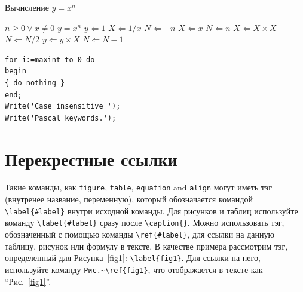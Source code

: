 \documentclass[pdflatex,sn-mathphys-gost]{pmi-jnl}
\begin{document}
\begin{algorithm}
\caption{Вычисление $y = x^n$}\label{algo1}
\begin{algorithmic}[1]
\Require $n \geq 0 \vee x \neq 0$
\Ensure $y = x^n$ 
\State $y \Leftarrow 1$
\label{algln2}
        \State $X \Leftarrow 1 / x$
        \State $N \Leftarrow -n$
\Else
        \State $X \Leftarrow x$
        \State $N \Leftarrow n$
\EndIf
{}
            \State $X \Leftarrow X \times X$
            \State $N \Leftarrow N / 2$
        \Else[$N$ is odd]
            \State $y \Leftarrow y \times X$
            \State $N \Leftarrow N - 1$
        \EndIf
\EndWhile
\end{algorithmic}
\end{algorithm}

\bigskip
\begin{minipage}{\hsize}%
\lstset{frame=single,framexleftmargin=-1pt,framexrightmargin=-17pt,framesep=12pt,linewidth=0.98\textwidth,language=pascal}%
\begin{lstlisting}
for i:=maxint to 0 do
begin
{ do nothing }
end;
Write('Case insensitive ');
Write('Pascal keywords.');
\end{lstlisting}
\end{minipage}

\section{Перекрестные ссылки}\label{sec8}

Такие команды, как \verb+figure+, \verb+table+, \verb+equation+ and \verb+align+ могут иметь тэг (внутренее название, переменную), который обозначается командой \verb+\label{#label}+ внутри исходной команды. Для рисунков и таблиц используйте команду \verb+\label{#label}+ сразу после \verb+\caption{}+. Можно использовать тэг, обозначенный с помощью команды \verb+\ref{#label}+, для ссылки на данную таблицу, рисунок или формулу в тексте. В качестве примера рассмотрим тэг, определенный для Рисунка~\ref{fig1}: \verb+\label{fig1}+. Для ссылки на него, используйте команду \verb+Рис.~\ref{fig1}+, что отображается в тексте как ``Рис.~\ref{fig1}''. 
\end{document}
